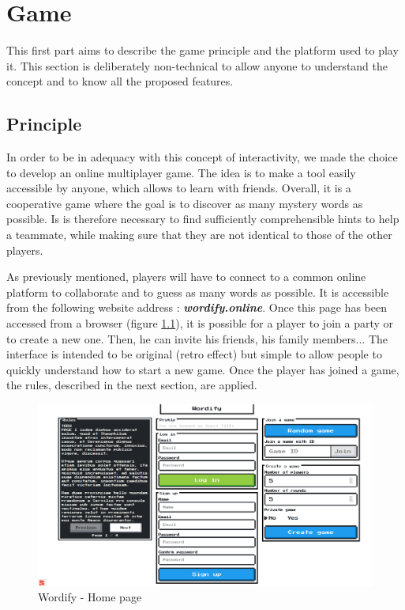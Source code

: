 \documentclass{tnreport}
\begin{document}
\cleardoublepage

\chapter{Game}

This first part aims to describe the game principle and the platform used to play it. This section is deliberately non-technical to allow anyone to understand the concept and to know all the proposed features. 

\section{Principle}

In order to be in adequacy with this concept of interactivity, we made the choice to develop an online multiplayer game. The idea is to make a tool easily accessible by anyone, which allows to learn with friends. Overall, it is a cooperative game where the goal is to discover as many mystery words as possible. Is is therefore necessary to find sufficiently comprehensible hints to help a teammate, while making sure that they are not identical to those of the other players.

As previously mentioned, players will have to connect to a common online platform to collaborate and to guess as many words as possible. It is accessible from the following website address : \textbf{\textit{wordify.online}}. Once this page has been accessed from a browser (figure \ref{fig:wordify_home_page}), it is possible for a player to join a party or to create a new one. Then, he can invite his friends, his family members... The interface is intended to be original (retro effect) but simple to allow people to quickly understand how to start a new game. Once the player has joined a game, the rules, described in the next section, are applied. 


\begin{figure}[ht]
	\centering
	\fboxsep=1.2pt
	\includegraphics[scale=0.33]{figures/wordify_home_page}
	\caption{Wordify - Home page}
	\label{fig:wordify_home_page}
\end{figure} 
\end{document}

